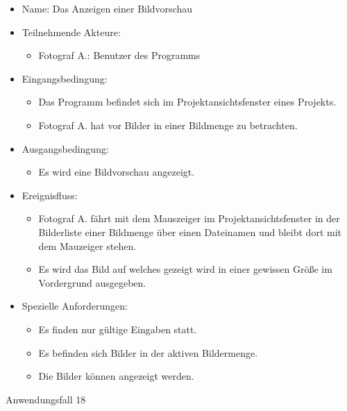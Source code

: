 	\begin{itemize}
		\item Name: Das Anzeigen einer Bildvorschau
		\item Teilnehmende Akteure:
		\begin{itemize}
			\item	Fotograf A.: Benutzer des Programms		
		\end{itemize}
		\item Eingangsbedingung:
		\begin{itemize}
			\item	Das Programm befindet sich im Projektansichtsfenster eines Projekts.
			\item Fotograf A. hat vor Bilder in einer Bildmenge zu betrachten.
		\end{itemize}
		\item Ausgangsbedingung:
		\begin{itemize}
			\item	Es wird eine Bildvorschau angezeigt.	
		\end{itemize}
		\item Ereignisfluss:
		\begin{itemize}
			\item Fotograf A. fährt mit dem Mauszeiger im Projektansichtsfenster in der Bilderliste einer Bildmenge über einen Dateinamen und bleibt dort mit dem Mauzeiger stehen.
			\item Es wird das Bild auf welches gezeigt wird in einer gewissen Größe im Vordergrund ausgegeben.
		\end{itemize}
		\item Spezielle Anforderungen:
		\begin{itemize}
			\item	Es finden nur gültige Eingaben statt.
			\item Es befinden sich Bilder in der aktiven Bildermenge.
			\item Die Bilder können angezeigt werden.			
		\end{itemize}			
	\end{itemize}
	
	\begin{description}
		\item[Anwendungsfall 18]
	\end{description}
	
